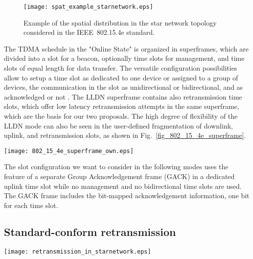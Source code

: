 \documentclass[times,10pt,twocolumn]{article}
\begin{document}
\begin{figure}[!h]
\centering
\texttt{[image: spat\_example\_starnetwork.eps]}
\caption{Example of the spatial distribution in the star network topology considered in the IEEE~802.15.4e standard.}
    \label{fig_spat_distr_standard_star}
\end{figure}

The TDMA schedule in the "Online State" is organized in superframes, which are divided into a slot for a beacon, optionally time slots for management, and time slots of equal length for data transfer. The versatile configuration possibilities allow to setup a time slot as dedicated to one device or assigned to a group of devices, the communication in the slot as unidirectional or bidirectional, and as acknowledged or not \cite{IEEE_STD_802.15.4e-2012}. The LLDN superframe contains also retransmission time slots, which offer low latency retransmission attempts in the same superframe, which are the basis for our two proposals. The high degree of flexibility of the LLDN mode can also be seen in the user-defined fragmentation of downlink, uplink, and retransmission slots, as shown in Fig.~\ref{fig_802_15_4e_superframe}.

\begin{figure*}[t!]
\centering
\texttt{[image: 802\_15\_4e\_superframe\_own.eps]}
\caption{Superframe in the LLDN mode of the IEEE~802.15.4e standard with separate Group Acknowledgement frame \cite{IEEE_STD_802.15.4e-2012}.}
    \label{fig_802_15_4e_superframe}
\end{figure*}


The slot configuration we want to consider in the following modes uses the feature of a separate Group Acknowledgement frame (GACK) in a dedicated uplink time slot while no management and no bidirectional time slots are used. The GACK frame includes the bit-mapped acknowledgement information, one bit for each time slot.

\subsection{Standard-conform retransmission}
\label{subsection_standard_conform_retransmission}
\begin{figure*}[!t]
\centering
\texttt{[image: retransmission\_in\_starnetwork.eps]}
\caption{Example of the schedule in the standard mode (SM). Device1 transmits successfully to the coordinator, while device2 needs a retransmission.}
    \label{fig_standard_star_schedule}
\end{figure*}
\end{document}
